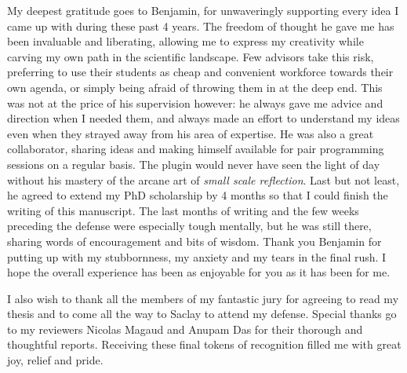 My deepest gratitude goes to Benjamin, for unwaveringly supporting every idea I came up with during these past 4 years. The freedom of thought he gave me has been invaluable and liberating, allowing me to express my creativity while carving my own path in the scientific landscape. Few advisors take this risk, preferring to use their students as cheap and convenient workforce towards their own agenda, or simply being afraid of throwing them in at the deep end. This was not at the price of his supervision however: he always gave me advice and direction when I needed them, and always made an effort to understand my ideas even when they strayed away from his area of expertise. He was also a great collaborator, sharing ideas and making himself available for pair programming sessions on a regular basis. The  plugin would never have seen the light of day without his mastery of the arcane art of \emph{small scale reflection}. Last but not least, he agreed to extend my PhD scholarship by 4 months so that I could finish the writing of this manuscript. The last months of writing and the few weeks preceding the defense were especially tough mentally, but he was still there, sharing words of encouragement and bits of wisdom. Thank you Benjamin for putting up with my stubbornness, my anxiety and my tears in the final rush. I hope the overall experience has been as enjoyable for you as it has been for me.

I also wish to thank all the members of my fantastic jury for agreeing to read my thesis and to come all the way to Saclay to attend my defense. Special thanks go to my reviewers Nicolas Magaud and Anupam Das for their thorough and thoughtful reports. Receiving these final tokens of recognition filled me with great joy, relief and pride.

